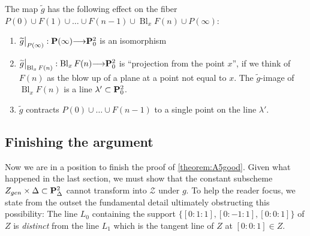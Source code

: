 \documentclass[12pt,reqno]{amsart}
\DeclareMathOperator{\Bl}{Bl}
\renewcommand{\to}{{\longrightarrow}}
\numberwithin{equation}{section}
\newcommand{\td}{\widetilde}
\begin{document}
The map $\td{g}$ has the following effect on the fiber
$P(0) \cup F(1) \cup \dots \cup F(n-1) \cup \Bl_{x}F(n) \cup
P(\infty)$:
\begin{enumerate}
\item $\td{g}\big|_{P(\infty)}: \P(\infty) \to \P^{2}_{0}$ is an
  isomorphism \\
\item $\td{g}\big|_{\Bl_{x}F(n)}: \Bl_{x}F(n) \to \P^{2}_{0}$ is
  ``projection from the point $x$'', if we think of $F(n)$ as the blow
  up of a plane at a point not equal to $x$.  The $\td{g}$-image of
  $\Bl_{x}F(n)$ is a line $\lambda' \subset \P^{2}_{0}$.\\
\item $\td{g}$ contracts $P(0) \cup \dots \cup F(n-1)$ to a single
  point on the line $\lambda'$.
\end{enumerate}

\subsection{Finishing the argument}
\label{sec:finishargument}

Now we are in a position to finish the proof of
\autoref{theorem:A5good}.  Given what happened in the last section, we
must show that the constant subscheme
$Z_{gen} \times \Delta \subset \P^{2}_{\Delta}$ cannot transform into
$\mathcal{Z}$ under $g$.  To help the reader focus, we state from the
outset the fundamental detail ultimately obstructing this possibility:
The line $L_0$ containing the support $\{[0:1:1], [0:-1:1], [0:0:1]\}$
of $Z$ is {\sl distinct} from the line $L_1$ which is the tangent line
of $Z$ at $[0:0:1] \in Z$.
\end{document}

